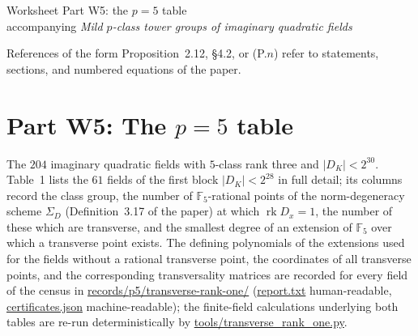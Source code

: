 \documentclass[11pt]{article}
\newcommand{\Ffive}{\mathbb F_5}
\newcommand{\rk}{\operatorname{rk}}
\providecommand{\nolinkurl}[1]{\url{#1}}
\begin{document}
\begin{center}
{\Large Worksheet Part W5: the $p=5$ table}\\[2mm]
accompanying \emph{Mild $p$-class tower groups of imaginary quadratic
fields}
\end{center}

\medskip
\noindent
References of the form Proposition~2.12, \S4.2, or (P.$n$) refer to
statements, sections, and numbered equations of the paper.

\section*{Part W5: The $p=5$ table}

The $204$ imaginary quadratic fields with $5$-class rank three and
$|D_K|<2^{30}$.  Table~1 lists the $61$ fields of the first block
$|D_K|<2^{28}$ in full detail; its columns record the class group, the number of $\Ffive$-rational points
of the norm-degeneracy scheme $\Sigma_D$ (Definition~3.17 of the
paper) at which $\rk D_x=1$, the number of these which are transverse,
and the smallest degree of an extension of $\Ffive$ over which a
transverse point exists.  The defining polynomials of the extensions used for the fields
without a rational transverse point, the coordinates of all
transverse points, and the corresponding transversality matrices are
recorded for every field of the census in
\nolinkurl{records/p5/transverse-rank-one/}
(\nolinkurl{report.txt} human-readable,
\nolinkurl{certificates.json} machine-readable); the finite-field
calculations underlying both tables are re-run deterministically by
\nolinkurl{tools/transverse\_rank\_one.py}.
\end{document}
